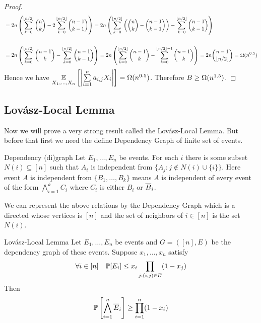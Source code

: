 \begin{proof}
\begin{align*}
	&=2n\left(\sum_{k=0}^{\lfloor n/2\rfloor}\binom{n}k-2\sum_{k=0}^{\lfloor n/2\rfloor}\binom{n-1}{k-1}\right)=2n\left(\sum_{k=0}^{\lfloor n/2\rfloor}\left(\binom{n}k-\binom{n-1}{k-1}\right)-\sum_{k=0}^{\lfloor n/2\rfloor}\binom{n-1}{k-1}\right)\\\\
	&=2n\left(\sum_{k=0}^{\lfloor n/2\rfloor}\binom{n-1}k-\sum_{k=0}^{\lfloor n/2\rfloor}\binom{n-1}{k-1}\right)=2n\left(\sum_{k=0}^{\lfloor n/2\rfloor}\binom{n-1}k-\sum_{k=0}^{\lfloor n/2\rfloor-1}\binom{n-1}k\right)=2n\binom{n-1}{\lfloor n/2\rfloor}=\Omega(n^{0.5})
\end{align*}Hence we have $\underset{X_1,\dots, X_n}{\mathbb{E}}\left[ \left|\sum\limits_{i=1}^na_{i,j}X_i \right| \right]=\Omega(n^{0.5})$. Therefore $B\geq \Omega(n^{1.5})$.
\end{proof}
\subsection{Lov\'{a}sz-Local Lemma}
Now we will prove a very strong result called the Lov\'{a}sz-Local Lemma. But before that first we need the define Dependency Graph of finite set of events.
\begin{Definition}{Dependency (di)graph}{}
	Let $E_1,\dots, E_n$ be events. For each $i$ there is some subset $N(i)\subseteq [n]$ such that $A_i$ is independent from $\{A_j\colon j\notin N(i)\cup \{i\}\}$. Here event $A$ is independent from $\{B_1,\dots, B_k\}$ means $A$ is independent of every event of the form $\bigwedge\limits_{i=1}^kC_i$ where $C_i$ is either $B_i$ or $\overline{B}_i$.\parinn
	
	We can represent the above relations by the Dependency Graph which is a directed whose vertices is $[n]$ and the set of neighbors of $i\in[n]$  is the set $N(i)$.
\end{Definition}
\begin{Theorem}{Lov\'{a}sz-Local Lemma}{}
	Let $E_1,\dots, E_n$ be events and $G=([n],E)$ be the dependency graph of these events. Suppose $x_1,\dots, x_n$ satisfy $$\forall i\in[n]\quad \mathbb{P}[E_i]\leq x_i\prod_{j:(i,j)\in E}(1-x_j)$$Then $$\mathbb{P}\left[\bigwedge_{i=1}^n\overline{E}_i\right]\geq \prod_{i=1}^n(1-x_i)$$
\end{Theorem}
